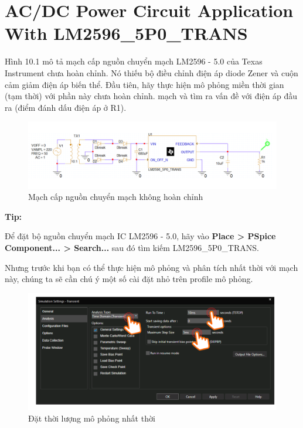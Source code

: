\section{AC/DC Power Circuit Application With LM2596\_5P0\_TRANS}
Hình 10.1 mô tả mạch cấp nguồn chuyển mạch LM2596 - 5.0 của Texas Instrument chưa hoàn chỉnh. Nó thiếu bộ điều chỉnh điện áp diode Zener và cuộn cảm giảm điện áp
biến thể. Đầu tiên, hãy thực hiện mô phỏng miền thời gian (tạm thời) với phần này chưa hoàn chỉnh.
mạch và tìm ra vấn đề với điện áp đầu ra (điểm đánh dấu điện áp ở R1).

\begin{figure}[h]
    \centering
    \includegraphics[scale=0.22]{graphics/ex10/f1.png}
    \caption{Mạch cấp nguồn chuyển mạch không hoàn chỉnh}
\end{figure}

\textbf{Tip:}

Để đặt bộ nguồn chuyển mạch IC LM2596 - 5.0, hãy vào \textbf{Place > PSpice Component...
> Search...} sau đó tìm kiếm LM2596\_5P0\_TRANS.

Nhưng trước khi bạn có thể thực hiện mô phỏng và phân tích nhất thời với mạch này, chúng ta sẽ
cần chú ý một số cài đặt nhỏ trên profile mô phỏng.

\begin{figure}[h]
    \centering
    \includegraphics[scale=0.3]{graphics/ex10/f2.png}
    \caption{Đặt thời lượng mô phỏng nhất thời}
\end{figure}

